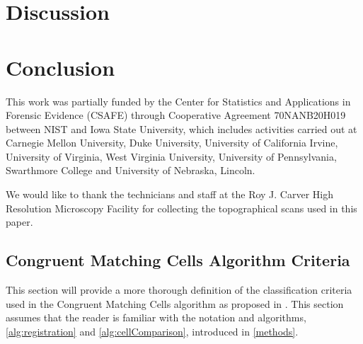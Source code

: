 \documentclass[reprint]{JASA}
\begin{document}
\hypertarget{discussion}{%
\section{Discussion}\label{discussion}}

\hypertarget{conclusion}{%
\section{Conclusion}\label{conclusion}}

\begin{acknowledgments}
This work was partially funded by the Center for Statistics and
Applications in Forensic Evidence (CSAFE) through Cooperative Agreement
70NANB20H019 between NIST and Iowa State University, which includes
activities carried out at Carnegie Mellon University, Duke University,
University of California Irvine, University of Virginia, West Virginia
University, University of Pennsylvania, Swarthmore College and
University of Nebraska, Lincoln.

We would like to thank the technicians and staff at the Roy J. Carver
High Resolution Microscopy Facility for collecting the topographical
scans used in this paper.

\end{acknowledgments}

\begin{appendices}

\section{Congruent Matching Cells Algorithm Criteria} \label{appendixCMC}

This section will provide a more thorough definition of the classification criteria used in the Congruent Matching Cells algorithm as proposed in \citet{song_proposed_2013}.
This section assumes that the reader is familiar with the notation and algorithms, \autoref{alg:registration} and \autoref{alg:cellComparison}, introduced in \ref{methods}.

\end{appendices}









\end{document}
